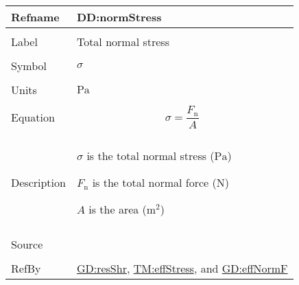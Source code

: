 \documentclass[12pt]{article}
\begin{document}
\vspace{\baselineskip}
\noindent
\begin{minipage}{\textwidth}
\begin{tabular}{>{\raggedright}p{}>{\raggedright\arraybackslash}p{}}
\toprule \textbf{Refname} & \textbf{DD:normStress}
\label{DD:normStress}
\\ \midrule \\
Label & Total normal stress
        
\\ \midrule \\
Symbol & $σ$
         
\\ \midrule \\
Units & ${\text{Pa}}$
        
\\ \midrule \\
Equation & \begin{displaymath}
           σ=\frac{{F_{\text{n}}}}{A}
           \end{displaymath}
\\ \midrule \\
Description & \begin{symbDescription}
              \item{$σ$ is the total normal stress (${\text{Pa}}$)}
              \item{${F_{\text{n}}}$ is the total normal force (${\text{N}}$)}
              \item{$A$ is the area (${\text{m}^{2}}$)}
              \end{symbDescription}
\\ \midrule \\
Source & \cite{huston2008}
         
\\ \midrule \\
RefBy & \hyperref[GD:resShr]{GD:resShr}, \hyperref[TM:effStress]{TM:effStress}, and \hyperref[GD:effNormF]{GD:effNormF}
        
\\ \bottomrule
\end{tabular}
\end{minipage}
\end{document}
